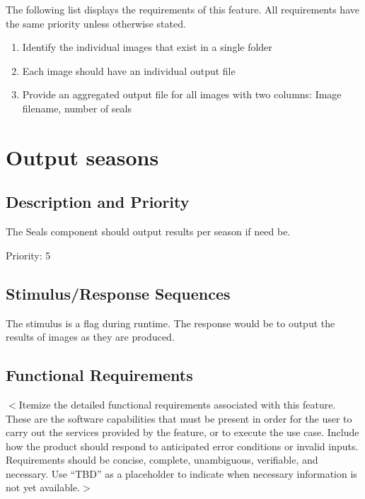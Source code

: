 \documentclass{scrreprt}
\begin{document}
The following list displays the requirements of this feature. All requirements
have the same priority unless otherwise stated. 


\begin{enumerate}[REQ-1:]
\item Identify the individual images that exist in a single folder
\item Each image should have an individual output file
\item Provide an aggregated output file for all images with two columns: Image 
filename, number of seals
\end{enumerate}

\section{Output seasons}

\subsection{Description and Priority}

The Seals component should output results per season if need be. 

Priority: 5

\subsection{Stimulus/Response Sequences}

The stimulus is a flag during runtime. The response would be to output the results
of images as they are produced.

\subsection{Functional Requirements}
\iffalse
$<$Itemize the detailed functional requirements associated with this feature.  
These are the software capabilities that must be present in order for the user 
to carry out the services provided by the feature, or to execute the use case.  
Include how the product should respond to anticipated error conditions or 
invalid inputs. Requirements should be concise, complete, unambiguous, 
verifiable, and necessary. Use “TBD” as a placeholder to indicate when necessary 
information is not yet available.$>$
\end{document}
